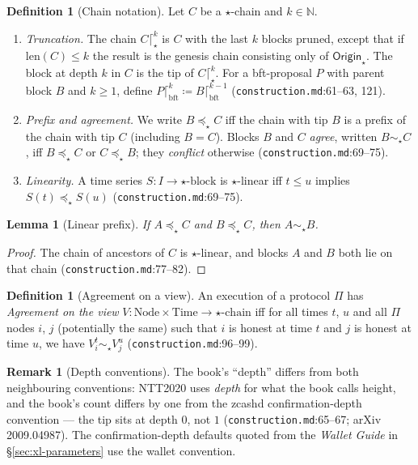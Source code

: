 \documentclass[11pt,a4paper]{article}
\newtheorem{lemma}[theorem]{Lemma}
\theoremstyle{definition}
\newtheorem{definition}[theorem]{Definition}
\newtheorem{remark}[theorem]{Remark}
\newcommand{\N}{\mathbb{N}}
\begin{document}
\begin{definition}[Chain notation]\label{def:xl-notation}
Let $C$ be a $\star$-chain and $k \in \N$.
\begin{enumerate}[label=(\roman*)]
\item \emph{Truncation.} The chain $C \lceil^{k}_{\star}$ is $C$ with the
  last $k$ blocks pruned, except that if $\mathrm{len}(C) \le k$ the
  result is the genesis chain consisting only of
  $\mathsf{Origin}_{\star}$. The block at depth $k$ in $C$ is the tip of
  $C \lceil^{k}_{\star}$. For a bft-proposal $P$ with parent block $B$ and
  $k \ge 1$, define $P \lceil^{k}_{\mathrm{bft}} \coloneqq B
  \lceil^{k-1}_{\mathrm{bft}}$
  (\texttt{construction.md}:61--63, 121).
\item \emph{Prefix and agreement.} We write $B \preceq_{\star} C$ iff the
  chain with tip $B$ is a prefix of the chain with tip $C$ (including $B =
  C$). Blocks $B$ and $C$ \emph{agree}, written $B \sim_{\star} C$, iff $B
  \preceq_{\star} C$ or $C \preceq_{\star} B$; they \emph{conflict}
  otherwise (\texttt{construction.md}:69--75).
\item \emph{Linearity.} A time series $S : I \to
  \text{$\star$-block}$ is $\star$-linear iff $t \le u$ implies $S(t)
  \preceq_{\star} S(u)$ (\texttt{construction.md}:69--75).
\end{enumerate}
\end{definition}

\begin{lemma}[Linear prefix]\label{lem:xl-linear-prefix}
If $A \preceq_{\star} C$ and $B \preceq_{\star} C$, then $A \sim_{\star}
B$.
\end{lemma}
\begin{proof}
The chain of ancestors of $C$ is $\star$-linear, and blocks $A$ and $B$
both lie on that chain (\texttt{construction.md}:77--82).
\end{proof}

\begin{definition}[Agreement on a view]\label{def:xl-agreement-view}
An execution of a protocol $\Pi$ has \emph{Agreement on the view} $V :
\mathrm{Node} \times \mathrm{Time} \to \text{$\star$-chain}$ iff for all
times $t$, $u$ and all $\Pi$ nodes $i$, $j$ (potentially the same) such
that $i$ is honest at time $t$ and $j$ is honest at time $u$, we have
$V_i^t \sim_{\star} V_j^u$ (\texttt{construction.md}:96--99).
\end{definition}

\begin{remark}[Depth conventions]\label{rem:xl-depth}
The book's ``depth'' differs from both neighbouring conventions: NTT2020
uses \emph{depth} for what the book calls height, and the book's count
differs by one from the zcashd confirmation-depth convention --- the tip
sits at depth $0$, not $1$ (\texttt{construction.md}:65--67; arXiv
2009.04987). The confirmation-depth defaults quoted from the
\emph{Wallet Guide} in \S\ref{sec:xl-parameters} use the wallet
convention.
\end{remark}
\end{document}
